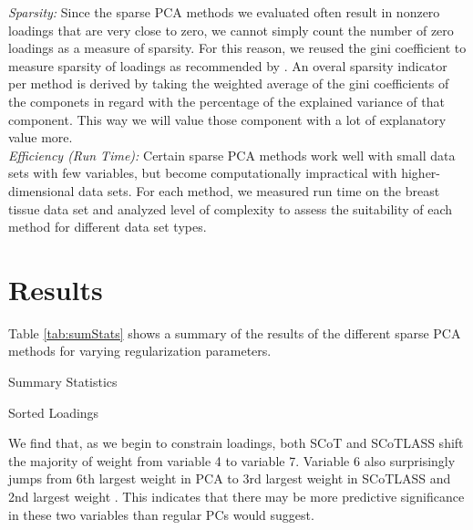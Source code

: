 \documentclass[11pt,letterpaper]{report}
\begin{document}
\textit{Sparsity:} Since the sparse PCA methods we evaluated often result in nonzero loadings that are very close to zero, we cannot simply count the number of zero loadings as a measure of sparsity. For this reason, we reused the gini coefficient to measure sparsity of loadings as recommended by . An overal sparsity indicator per method is derived by taking the weighted average of the gini coefficients of the componets in regard with the percentage of the explained variance of that component. This way we will value those component with a lot of explanatory value more.\\

\textit{Efficiency (Run Time):} Certain sparse PCA methods work well with small data sets with few variables, but become computationally impractical with higher-dimensional data sets. For each method, we measured run time on the breast tissue data set and analyzed level of complexity to assess the suitability of each method for different data set types.

\section*{Results}

Table \ref{tab:sumStats} shows a summary of the results of the different sparse PCA methods for varying regularization parameters.\\

\begin{table}[htpb!]
    \begin{minipage}{.49\linewidth}
        \caption{Summary Statistics}
        \label{tab:sumStats}
        \centering
        
    \end{minipage}
    \begin{minipage}{.49\linewidth}
        \caption{Sorted Loadings}
        \label{tab:sorLoad}
        \centering
        
    \end{minipage}
\end{table}

We find that, as we begin to constrain loadings, both SCoT and SCoTLASS shift the majority of weight from variable 4 to variable 7. Variable 6 also surprisingly jumps from 6th largest weight in PCA to 3rd largest weight in SCoTLASS and 2nd largest weight . This indicates that there may be more predictive significance in these two variables than regular PCs would suggest. \\
\end{document}
